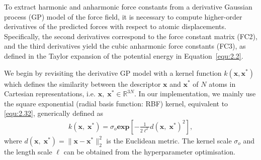 To extract harmonic and anharmonic force constants from a derivative Gaussian process (GP) model of the force field, it is necessary to compute higher-order derivatives of the predicted forces with respect to atomic displacements. Specifically, the second derivatives correspond to the force constant matrix (FC2), and the third derivatives yield the cubic anharmonic force constants (FC3), as defined in the Taylor expansion of the potential energy in Equation~\eqref{equ:2.2}. 

We begin by revisiting the derivative GP model with a kernel function $k(\mathbf{x},\mathbf{x}^{*})$ which defines the similarity between the descriptor $\mathbf{x}$ and $\mathbf{x}^{*}$ of $N$ atoms in Cartesian representations, i.e. $\mathbf{x},\;\mathbf{x}^{*}\in\mathbb{R}^{3N}$.
In our implementation, we mainly use the square exponential (radial basis function: RBF) kernel, equivalent to \eqref{equ:2.32}, generically defined as
\begin{equation} \label{equ:3.1}
        \begin{split}
            k(\mathbf{x},\;\mathbf{x}^{*})= \sigma_{o}\mathbf{exp}\left[-\frac{1}{2\ell^{2}}d(\mathbf{x},\;\mathbf{x}^{*})^{2}\right],
        \end{split}
\end{equation}
where $d(\mathbf{x},\;\mathbf{x}^{*})=\lVert\mathbf{x}-\mathbf{x}^{*}\rVert^{2}_{2}$ is the Euclidean metric.
The kernel scale $\sigma_{o}$ and the length scale $\ell$ can be obtained from the hyperparameter optimisation.


